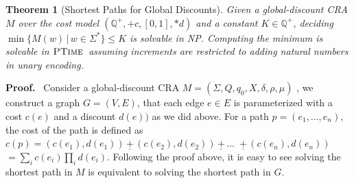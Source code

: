 \documentclass[11pt]{article}
\newtheorem{theorem}{Theorem}
\def\Proof{{\bf Proof.}}
\newcommand{\posrat}{\ensuremath{\mathbb{Q}^+}}
\newcommand{\sep}{\ensuremath{\,|\,}}
\newcommand{\inputalph}{\ensuremath{\Sigma}}
\newcommand{\fm}[1]{\ensuremath{#1^{*}}}
\newcommand{\ptime}{\ensuremath{\sc\textsc{PTime}}\xspace}
\newcommand{\np}{{\sc\textsc NP}\xspace}
\newcommand{\edwa}{\ensuremath{M}}
\newcommand{\edwastates}{\ensuremath{Q}}
\newcommand{\edwastate}{\ensuremath{q}}
\newcommand{\edwainitst}{\ensuremath{\edwastate_0}}
\newcommand{\edwavariables}{\ensuremath{X}}
\newcommand{\edwatrans}{\ensuremath{\delta}}
\newcommand{\edwavarup}{\ensuremath{\rho}}
\newcommand{\edwafinal}{\ensuremath{\mu}}
\def\gdplus{\,\underline{+}\,}
\begin{document}
\begin{theorem}[Shortest Paths for Global Discounts]
Given a global-discount CRA $\edwa$ over the cost model
$(\posrat,+c,[0,1],*d)$ and a constant $K\in\posrat$, deciding
$\min\{\edwa(w)\sep w\in\fm\Sigma\}\le K$ is solvable in \np.
Computing the minimum is solvable in \ptime\ assuming increments are
restricted to adding natural numbers in unary encoding.
\end{theorem}
\Proof~
Consider a global-discount CRA $\edwa = (\inputalph, \edwastates, \edwainitst, \edwavariables, \edwatrans, \edwavarup, \edwafinal)$
, we construct a graph $G=(V,E)$, that each edge $e\in E$ is parameterized with a cost $c(e)$ and a discount $d(e))$ as we did above.
For a path $p=(e_1,\ldots,e_n)$,
the cost of the path is defined as $c(p)=(c(e_1),d(e_1))\gdplus (c(e_2),d(e_2))\gdplus \ldots$ $\gdplus (c(e_n),d(e_n))$ $=\sum_i c(e_i) \prod_i d(e_i)$.
Following the proof above, it is easy to see solving the shortest path in $\edwa$ is equivalent to solving the shortest path in $G$.
\end{document}
